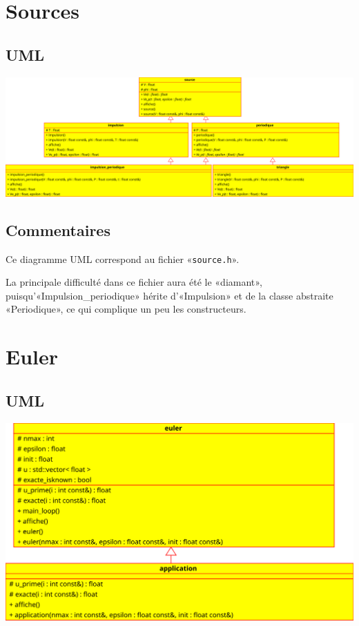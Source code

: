 \documentclass{report}
\begin{document}
\chapter{Sources}
    \begin{multicols}{2}
        \section{UML}
            \includegraphics[width=\linewidth+\linewidth,angle=90]{images/sources_large}

        \section{Commentaires}
            Ce diagramme UML correspond au fichier «\verb|source.h|».

            La principale difficulté dans ce fichier aura été le «diamant», puisqu’«Impulsion\_periodique» hérite
            d’«Impulsion» et de la classe abstraite «Periodique», ce qui complique un peu les constructeurs.

    \end{multicols}

\chapter{Euler}
    \section{UML}
        \includegraphics{images/euler_alone}
\end{document}
